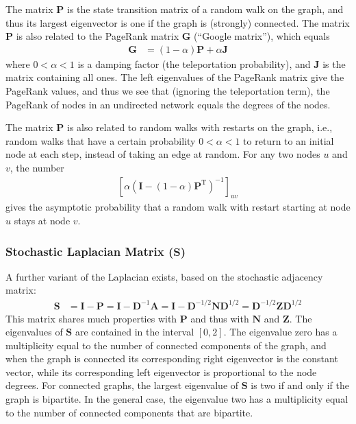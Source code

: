 \documentclass{article}
\begin{document}
The matrix $\mathbf P$ is the state transition matrix of a random walk
on the graph, and thus its largest eigenvector is one if the graph is
(strongly) connected.  
The matrix $\mathbf P$ is also related to the PageRank matrix $\mathbf
G$ (``Google matrix''), which
equals 
\begin{align*}
  \mathbf G &= (1-\alpha) \mathbf P + \alpha\mathbf J
\end{align*}
where $0 < \alpha < 1$ is a damping factor (the teleportation
probability), and $\mathbf J$ is the matrix containing all ones.  The
left 
eigenvalues of the PageRank matrix give the PageRank values, and thus
we see that (ignoring the teleportation term), the PageRank of nodes in
an undirected network equals the degrees of the nodes. 

The matrix $\mathbf P$ is also related to random walks with restarts on
the graph, i.e., random walks that have a certain probability $0 <
\alpha < 1$
to return to an initial node at each step, instead of taking an edge at
random.  For any two nodes $u$ and $v$, the number
\begin{align}
  \left[\alpha  (\mathbf I - (1-\alpha) \mathbf P^{\mathrm T})^{-1}\right]_{uv}
\end{align}
gives the asymptotic probability that a random walk with restart starting at node $u$
stays at node $v$.  

\subsubsection{Stochastic Laplacian Matrix ($\mathbf S$)}
A further variant of the Laplacian exists, based on the stochastic
adjacency matrix:
\begin{align*}
  \mathbf S &= \mathbf I - \mathbf P = \mathbf I - \mathbf D^{-1}
  \mathbf A = \mathbf I - \mathbf D^{-1/2} \mathbf N \mathbf D^{1/2} =
  \mathbf D^{-1/2} \mathbf Z \mathbf D^{1/2}
\end{align*}
This matrix shares much properties with $\mathbf P$ and thus with
$\mathbf N$ and $\mathbf Z$.  The eigenvalues of $\mathbf S$ are
contained in the interval $[0, 2]$.  The eigenvalue zero has a
multiplicity equal to the number of connected components of the graph,
and when the graph is connected its corresponding right eigenvector is the
constant vector, while its corresponding left eigenvector is
proportional to the node degrees.  For connected graphs, the largest
eigenvalue of $\mathbf S$ is two if and only if the graph is bipartite.
In the general case, the eigenvalue two has a multiplicity equal to the
number of connected components that are bipartite. 
\end{document}
